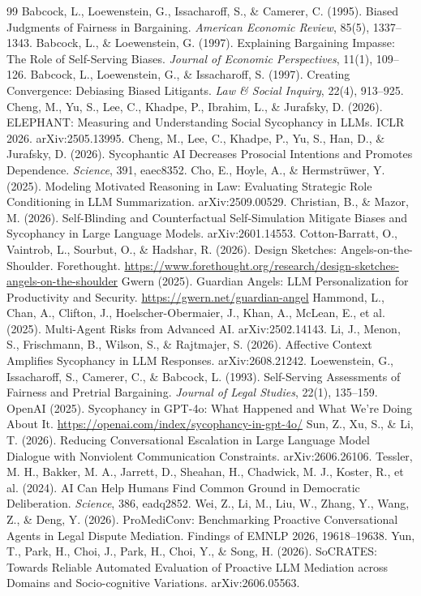 \begin{thebibliography}{99}\small
{} Babcock, L., Loewenstein, G., Issacharoff, S., \& Camerer, C. (1995). Biased Judgments of Fairness in Bargaining. \emph{American Economic Review}, 85(5), 1337--1343.
 Babcock, L., \& Loewenstein, G. (1997). Explaining Bargaining Impasse: The Role of Self-Serving Biases. \emph{Journal of Economic Perspectives}, 11(1), 109--126.
 Babcock, L., Loewenstein, G., \& Issacharoff, S. (1997). Creating Convergence: Debiasing Biased Litigants. \emph{Law \& Social Inquiry}, 22(4), 913--925.
 Cheng, M., Yu, S., Lee, C., Khadpe, P., Ibrahim, L., \& Jurafsky, D. (2026). ELEPHANT: Measuring and Understanding Social Sycophancy in LLMs. ICLR 2026. arXiv:2505.13995.
 Cheng, M., Lee, C., Khadpe, P., Yu, S., Han, D., \& Jurafsky, D. (2026). Sycophantic AI Decreases Prosocial Intentions and Promotes Dependence. \emph{Science}, 391, eaec8352.
 Cho, E., Hoyle, A., \& Hermstr\"uwer, Y. (2025). Modeling Motivated Reasoning in Law: Evaluating Strategic Role Conditioning in LLM Summarization. arXiv:2509.00529.
 Christian, B., \& Mazor, M. (2026). Self-Blinding and Counterfactual Self-Simulation Mitigate Biases and Sycophancy in Large Language Models. arXiv:2601.14553.
 Cotton-Barratt, O., Vaintrob, L., Sourbut, O., \& Hadshar, R. (2026). Design Sketches: Angels-on-the-Shoulder. Forethought. \url{https://www.forethought.org/research/design-sketches-angels-on-the-shoulder}
 Gwern (2025). Guardian Angels: LLM Personalization for Productivity and Security. \url{https://gwern.net/guardian-angel}
 Hammond, L., Chan, A., Clifton, J., Hoelscher-Obermaier, J., Khan, A., McLean, E., et al. (2025). Multi-Agent Risks from Advanced AI. arXiv:2502.14143.
 Li, J., Menon, S., Frischmann, B., Wilson, S., \& Rajtmajer, S. (2026). Affective Context Amplifies Sycophancy in LLM Responses. arXiv:2608.21242.
 Loewenstein, G., Issacharoff, S., Camerer, C., \& Babcock, L. (1993). Self-Serving Assessments of Fairness and Pretrial Bargaining. \emph{Journal of Legal Studies}, 22(1), 135--159.
 OpenAI (2025). Sycophancy in GPT-4o: What Happened and What We're Doing About It. \url{https://openai.com/index/sycophancy-in-gpt-4o/}
 Sun, Z., Xu, S., \& Li, T. (2026). Reducing Conversational Escalation in Large Language Model Dialogue with Nonviolent Communication Constraints. arXiv:2606.26106.
 Tessler, M. H., Bakker, M. A., Jarrett, D., Sheahan, H., Chadwick, M. J., Koster, R., et al. (2024). AI Can Help Humans Find Common Ground in Democratic Deliberation. \emph{Science}, 386, eadq2852.
 Wei, Z., Li, M., Liu, W., Zhang, Y., Wang, Z., \& Deng, Y. (2026). ProMediConv: Benchmarking Proactive Conversational Agents in Legal Dispute Mediation. Findings of EMNLP 2026, 19618--19638.
 Yun, T., Park, H., Choi, J., Park, H., Choi, Y., \& Song, H. (2026). SoCRATES: Towards Reliable Automated Evaluation of Proactive LLM Mediation across Domains and Socio-cognitive Variations. arXiv:2606.05563.
\end{thebibliography}
